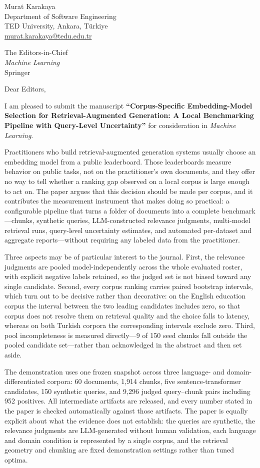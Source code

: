 \documentclass[10pt,a4paper]{article}
\begin{document}
\noindent
Murat Karakaya\\
Department of Software Engineering\\
TED University, Ankara, T\"urkiye\\
\href{mailto:murat.karakaya@tedu.edu.tr}{murat.karakaya@tedu.edu.tr}

\bigskip
\noindent
The Editors-in-Chief\\
\emph{Machine Learning}\\
Springer

\bigskip
\noindent
Dear Editors,

\medskip
I am pleased to submit the manuscript \textbf{``Corpus-Specific Embedding-Model Selection for
Retrieval-Augmented Generation: A Local Benchmarking Pipeline with Query-Level Uncertainty''}
for consideration in \emph{Machine Learning}.

Practitioners who build retrieval-augmented generation systems usually choose an embedding
model from a public leaderboard. Those leaderboards measure behavior on public tasks, not on
the practitioner's own documents, and they offer no way to tell whether a ranking gap observed
on a local corpus is large enough to act on. The paper argues that this decision should be made
per corpus, and it contributes the measurement instrument that makes doing so practical: a
configurable pipeline that turns a folder of documents into a complete benchmark---chunks,
synthetic queries, LLM-constructed relevance judgments, multi-model retrieval runs, query-level
uncertainty estimates, and automated per-dataset and aggregate reports---without requiring any
labeled data from the practitioner.

Three aspects may be of particular interest to the journal. First, the relevance judgments are
pooled model-independently across the whole evaluated roster, with explicit negative labels
retained, so the judged set is not biased toward any single candidate. Second, every corpus
ranking carries paired bootstrap intervals, which turn out to be decisive rather than
decorative: on the English education corpus the interval between the two leading candidates
includes zero, so that corpus does not resolve them on retrieval quality and the choice falls to
latency, whereas on both Turkish corpora the corresponding intervals exclude zero. Third, pool
incompleteness is measured directly---9 of 150 seed chunks fall outside the pooled candidate
set---rather than acknowledged in the abstract and then set aside.

The demonstration uses one frozen snapshot across three language- and domain-differentiated
corpora: 60 documents, 1{,}914 chunks, five sentence-transformer candidates, 150 synthetic
queries, and 9{,}296 judged query--chunk pairs including 952 positives. All intermediate
artifacts are released, and every number stated in the paper is checked automatically against
those artifacts. The paper is equally explicit about what the evidence does not establish: the
queries are synthetic, the relevance judgments are LLM-generated without human validation, each
language and domain condition is represented by a single corpus, and the retrieval geometry and
chunking are fixed demonstration settings rather than tuned optima.
\end{document}
